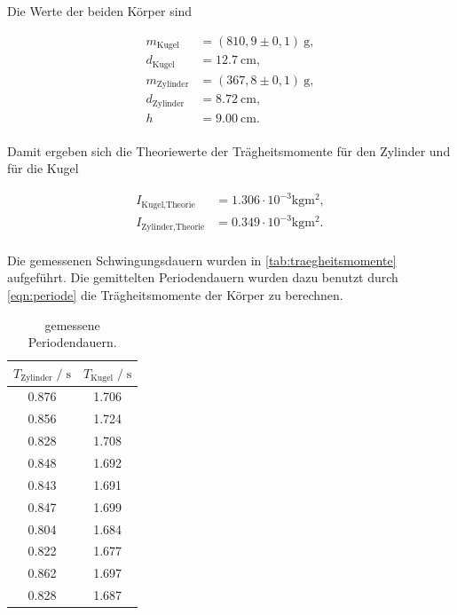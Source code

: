 



Die Werte der beiden Körper sind

\begin{align*}
  m_{\text{Kugel}} &= (810,9 \pm 0,1)\:\si{\gram}, \\
  d_{\text{Kugel}} &= \SI{12,7}{\centi\meter}, \\
  m_{\text{Zylinder}} &= (367,8\pm 0,1)\:\si{\gram}, \\
  d_{\text{Zylinder}} &=  \SI{8,72}{\centi\meter}, \\
  h &= \SI{9,00}{\centi\meter}. \\
\end{align*}

Damit ergeben sich die Theoriewerte der Trägheitsmomente für den Zylinder und für die Kugel

\begin{align*}
  I_{\text{Kugel,Theorie}} &= 1.306 \cdot 10^{-3} \si{\kilogram\meter^2}, \\
  I_{\text{Zylinder,Theorie}} &= 0.349 \cdot 10^{-3} \si{\kilogram\meter^2}. \\
\end{align*}

Die gemessenen Schwingungsdauern wurden in \autoref{tab:traegheitsmomente} aufgeführt. Die gemittelten Periodendauern wurden dazu benutzt
durch \autoref{eqn:periode} die Trägheitsmomente der Körper zu berechnen.

\begin{table}[H]
  \centering
   \caption{gemessene Periodendauern.}
   \label{tab:traegheitsmomente}
   \begin{tabular}{c c}
      \toprule
      $ T_{\text{Zylinder}} \;/\; \si{\second}$ & $ T_{\text{Kugel}} \;/\; \si{\second}$ \\
      \midrule
      0.876 & 1.706 \\
      0.856 & 1.724 \\
      0.828 & 1.708 \\
      0.848 & 1.692 \\
      0.843 & 1.691 \\
      0.847 & 1.699 \\
      0.804 & 1.684 \\
      0.822 & 1.677 \\
      0.862 & 1.697 \\
      0.828 & 1.687 \\
      \bottomrule
   \end{tabular}
\end{table}

